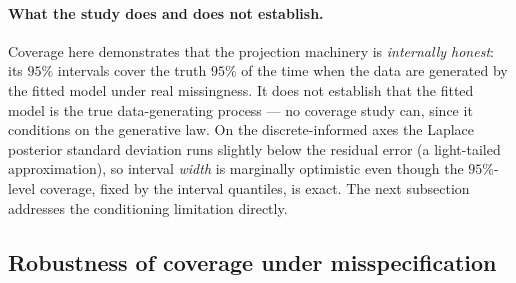 \documentclass[11pt]{article}
\theoremstyle{plain}
\theoremstyle{definition}
\begin{document}
\paragraph{What the study does and does not establish.} Coverage here demonstrates that the
projection machinery is \emph{internally honest}: its $95\%$ intervals cover the truth $95\%$
of the time when the data are generated by the fitted model under real missingness. It does
not establish that the fitted model is the true data-generating process --- no coverage study
can, since it conditions on the generative law. On the discrete-informed axes the Laplace
posterior standard deviation runs slightly below the residual error (a light-tailed
approximation), so interval \emph{width} is marginally optimistic even though the
$95\%$-level coverage, fixed by the interval quantiles, is exact. The next subsection addresses
the conditioning limitation directly.

\subsection{Robustness of coverage under misspecification}
\label{sub:misspec}
\end{document}
